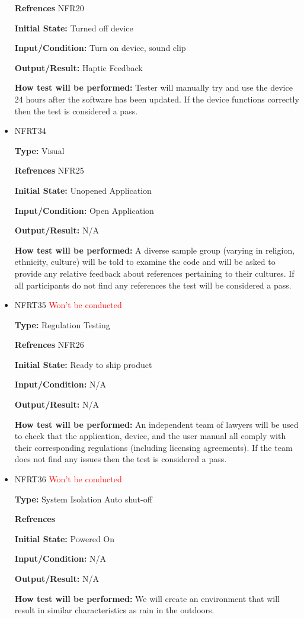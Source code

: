 \documentclass[12pt, titlepage]{article}
\begin{document}
\begin{itemize}
\textbf{Refrences} NFR20
					
\textbf{Initial State:} Turned off device
					
\textbf{Input/Condition:} Turn on device, sound clip
					
\textbf{Output/Result:} Haptic Feedback
					
\textbf{How test will be performed:} Tester will manually try and use the device 24 hours after the software has been updated. If the device functions correctly then the test is considered a pass.

\item{NFRT34}

\textbf{Type:} Visual

\textbf{Refrences} NFR25
					
\textbf{Initial State:} Unopened Application
					
\textbf{Input/Condition:} Open Application
					
\textbf{Output/Result:} N/A
					
\textbf{How test will be performed:} A diverse sample group (varying in religion, ethnicity, culture) will be told to examine the code and will be asked to provide any relative feedback about references pertaining to their cultures. If all participants do not find any references the test will be considered a pass. 

\item{NFRT35} \textcolor{red}{Won't be conducted}

\textbf{Type:} Regulation Testing

\textbf{Refrences} NFR26
					
\textbf{Initial State:} Ready to ship product
					
\textbf{Input/Condition:} N/A
					
\textbf{Output/Result:} N/A
					
\textbf{How test will be performed:} An independent team of lawyers will be used to check that the application, device, and the user manual all comply with their corresponding regulations (including licensing agreements). If the team does not find any issues then the test is considered a pass.

\item{NFRT36} \textcolor{red}{Won't be conducted}

\textbf{Type:} System Isolation Auto shut-off

\textbf{Refrences} 
					
\textbf{Initial State:} Powered On
					
\textbf{Input/Condition:} N/A
					
\textbf{Output/Result:} N/A
					
\textbf{How test will be performed:} We will create an environment that will result in similar characteristics as rain in the outdoors.


\end{itemize}
\end{document}
